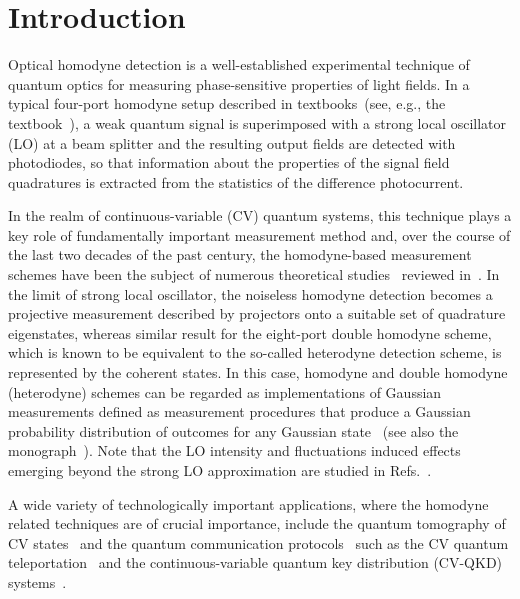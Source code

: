 \documentclass[%
reprint,
superscriptaddress,
 amsmath,amssymb,amsfonts,
 aps,
 pra,
 longbibliography
]{revtex4-2}
\begin{document}
 \maketitle

\section{Introduction}
\label{sec:intro}

Optical homodyne detection is a
well-established experimental technique of quantum optics for
measuring phase-sensitive properties of
light fields.
In a typical four-port homodyne setup
described in textbooks~(see, e.g., the textbook~\cite{Vogel:bk:2006}),
a weak quantum signal is superimposed with a strong local oscillator (LO) at a beam splitter
and the resulting output fields are detected
with photodiodes,
so that information
about the properties of the signal field quadratures
is extracted from the statistics of the difference photocurrent.

In the realm of continuous-variable (CV) quantum systems,
this technique plays a key role of fundamentally important measurement method 
and,
over the course of the last two decades of the past century,
the homodyne-based measurement schemes
have been the subject of numerous
theoretical
studies~\cite{Yuen:ieee:1978,Yuen:ieee:1979,Yuen:ieee:1980,Yuen:ol:1983,
  Walker:jmo:1987,Collett:jmo:1987,Braunstein:pra:1990,Vogel:pra:1993,Leonhardt:pra:1993,Ban:jmo:1997,Banaszek:pra:1997,Kuzmich:jmo:1998,Feng:josab:2016}
reviewed in~\cite{Welsch:progopt:1999}.
In the limit of strong local oscillator,
the noiseless homodyne detection becomes a projective measurement
described by projectors onto a suitable set of quadrature eigenstates,
whereas similar result for the eight-port double homodyne scheme,
which is known to be equivalent to
the so-called heterodyne detection scheme,
is represented by the coherent states.
In this case,
homodyne and double homodyne (heterodyne)
schemes can be regarded as implementations
of Gaussian measurements defined as measurement procedures that
produce a Gaussian probability distribution of outcomes for any
Gaussian state~\cite{Giedke:pra:2002,Fiurasek:pra:2007}
(see also the monograph~\cite{Serafini:bk:2023}).
Note that the
LO intensity and fluctuations
induced effects emerging beyond the strong LO approximation
are studied in
Refs.~\cite{Vogel:pra:1995,Cives:joptb:2000,Auyuanet:josab:2019,Olivares:pla:2020,Thekkadath:pra:2020}. 

A wide variety of technologically important applications,
where the homodyne related techniques
are of crucial importance,
include the quantum tomography of
CV states~\cite{Leonhardt:bk:1997,Smithey:prl:1993,Kuhn:pra:1995,DAuria:prl:2009,Lvovsky:rmp:2009,Buono:josab:2010,Teo:pra:2017,Tiunov:optica:2020,Olivares:njp:2019,Bing:optexp:2020,Kumar:pra:2022,Oh:npjqi:2019}
and
the quantum communication protocols~\cite{Braunstein:rmp:2005,Semenov:pra:2012}
such as the CV quantum teleportation~\cite{Furusawa:sci:1998,Shi:lpor.2023}
and the continuous-variable quantum key
distribution (CV-QKD)
systems~\cite{Grosshans:prl:2002,Weedbrook:prl:2004,Weed:rmp:2012,Zhang:apr:2024}.
\end{document}
